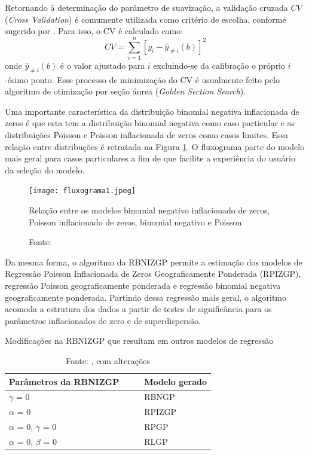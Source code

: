 \documentclass[12pt, a4paper, twoside]{report}
\numberwithin{equation}{section} %
\begin{document}
Retornando à determinação do parâmetro de suavização, a validação cruzada $CV$ (\textit{Cross Validation}) é comumente utilizada como critério de escolha, conforme sugerido por \cite{cleveland1979}. Para isso, o CV é calculado como:
\begin{equation}\label{CV_gwr}
CV=\sum \limits^{n}_{i=1}[y_i-\hat{y}_{\neq i}(b)]^2
\end{equation}
onde $\hat{y}_{\not=i}(b)$ é o valor ajustado para $i$ excluindo-se da calibração o próprio $i$-ésimo ponto. Esse processo de minimização do CV é usualmente feito pelo algoritmo de otimização por seção áurea (\textit{Golden Section Search}). 

Uma importante característica da distribuição binomial negativa inflacionada de zeros é que esta tem a distribuição binomial negativa como caso particular e as distribuições Poisson e Poisson inflacionada de zeros como casos limites. Essa relação entre distribuções é retratada na Figura \ref{fig:figura1}. O fluxograma parte do modelo mais geral para casos particulares a fim de que facilite a experiência do usuário da seleção do modelo. 

\begin{figure}[h]
    \centering
    \texttt{[image: fluxograma1.jpeg]}
\caption{Relação entre os modelos binomial negativo inflacionado de zeros, Poisson inflacionado de zeros, binomial negativo e Poisson}
\caption*{\footnotesize Fonte: \cite{dasilva2023}}
\label{fig:figura1}
\end{figure}

Da mesma forma, o algoritmo da RBNIZGP permite a estimação dos modelos de Regressão Poisson Inflacionada de Zeros Geograficamente Ponderada (RPIZGP), regressão Poisson geograficamente ponderada e regressão binomial negativa geograficamente ponderada. Partindo dessa regressão mais geral, o algoritmo acomoda a estrutura dos dados a partir de testes de significância para os parâmetros inflacionados de zero e de superdispersão.

\begin{table}[H]
\centering
\caption{Modificações na RBNIZGP que resultam em outros modelos de regressão}
\begin{tabular}{llll}
\hline
\multicolumn{1}{c}{\textbf{Parâmetros da RBNIZGP}} &  &  & \multicolumn{1}{c}{\textbf{Modelo gerado}} \\ \hline
$\gamma$ = 0                                       &  &  & RBNGP                                      \\
$\alpha$ = 0                                       &  &  & RPIZGP                                     \\
$\alpha$ = 0, $\gamma$ = 0                         &  &  & RPGP\footnotemark                                       \\
$\alpha$ = 0, $\beta$ = 0                          &  &  & RLGP                                       \\ \hline
\end{tabular}
\label{tab:parModels}
\caption*{\footnotesize Fonte: \cite{dasilva2023}, com alterações}
\end{table}
\end{document}
